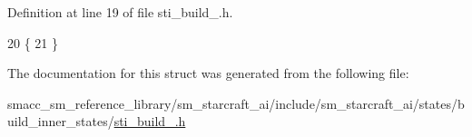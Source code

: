 Definition at line 19 of file sti\+\_\+build\+\_.\+h.


\begin{DoxyCode}
20   \{
21   \}
\end{DoxyCode}


The documentation for this struct was generated from the following file\+:\begin{DoxyCompactItemize}
\item 
smacc\+\_\+sm\+\_\+reference\+\_\+library/sm\+\_\+starcraft\+\_\+ai/include/sm\+\_\+starcraft\+\_\+ai/states/build\+\_\+inner\+\_\+states/\hyperlink{sti__build__1_8h}{sti\+\_\+build\+\_.\+h}\end{DoxyCompactItemize}
